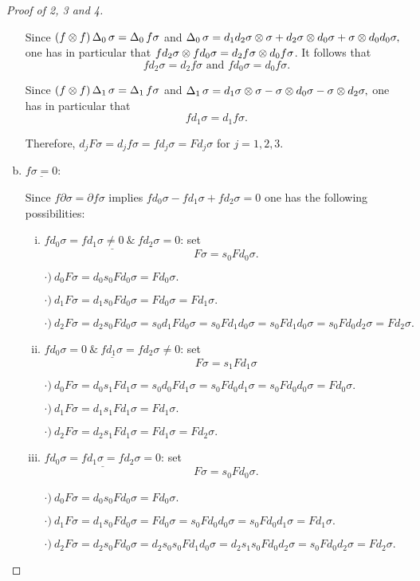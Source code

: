 \documentclass[main.tex]{subfiles}
\begin{document}
\begin{proof}[Proof of 2, 3 and 4]
\begin{enumerate}[a)]
    Since $(f\otimes f)\operatorname{\Delta}_0\sigma=\operatorname{\Delta}_0f\sigma$ and
    $\operatorname{\Delta}_0\sigma=d_1d_2\sigma\otimes\sigma + d_2\sigma\otimes d_0\sigma + \sigma\otimes d_0d_0\sigma,$
    one has in particular that $fd_2\sigma\otimes fd_0\sigma=d_2f\sigma\otimes d_0f\sigma$. It follows that $$fd_2\sigma=d_2f\sigma \text{ and } fd_0\sigma=d_0f\sigma.$$

    Since $(f\otimes f)\operatorname{\Delta}_1\sigma=\operatorname{\Delta}_1f\sigma$ and
    $\operatorname{\Delta}_1\sigma=d_1\sigma\otimes\sigma - \sigma\otimes d_0\sigma - \sigma\otimes d_2\sigma,$
    one has in particular that $$fd_1\sigma=d_1f\sigma.$$

    Therefore, $d_jF\sigma=d_jf\sigma=fd_j\sigma=Fd_j\sigma$ for $j=1,2,3$. \par

    \item $\underline{f\sigma=0}$: \vspace*{5pt}\par

    Since $f\partial\sigma=\partial f\sigma$ implies $fd_0\sigma-fd_1\sigma+fd_2\sigma=0$ one has the following possibilities:

        \begin{enumerate}[i)]

        \item $\underline{fd_0\sigma=fd_1\sigma\neq0\ \&\ fd_2\sigma=0}$: set $$F\sigma=s_0Fd_0\sigma.$$

        $\cdot)\ d_0F\sigma=d_0s_0Fd_0\sigma=Fd_0\sigma.$\par
        $\cdot)\ d_1F\sigma=d_1s_0Fd_0\sigma=Fd_0\sigma=Fd_1\sigma.$\par
        $\cdot)\ d_2F\sigma=d_2s_0Fd_0\sigma=s_0d_1Fd_0\sigma=s_0Fd_1d_0\sigma=s_0Fd_1d_0\sigma=s_0Fd_0d_2\sigma=Fd_2\sigma.$

        \item $\underline{fd_0\sigma=0\ \&\ fd_1\sigma=fd_2\sigma\neq0}$: set $$F\sigma=s_1Fd_1\sigma$$

        $\cdot)\ d_0F\sigma=d_0s_1Fd_1\sigma=s_0d_0Fd_1\sigma=s_0Fd_0d_1\sigma=s_0Fd_0d_0\sigma=Fd_0\sigma.$\par
        $\cdot)\ d_1F\sigma=d_1s_1Fd_1\sigma=Fd_1\sigma.$\par
        $\cdot)\ d_2F\sigma=d_2s_1Fd_1\sigma=Fd_1\sigma=Fd_2\sigma.$

        \item $\underline{fd_0\sigma=fd_1\sigma=fd_2\sigma=0}$: set $$F\sigma=s_0Fd_0\sigma.$$

        $\cdot)\ d_0F\sigma=d_0s_0Fd_0\sigma=Fd_0\sigma$.\par
        $\cdot)\ d_1F\sigma=d_1s_0Fd_0\sigma=Fd_0\sigma=s_0Fd_0d_0\sigma=s_0Fd_0d_1\sigma=Fd_1\sigma.$\par
        $\cdot)\ d_2F\sigma=d_2s_0Fd_0\sigma=d_2s_0s_0Fd_1d_0\sigma=d_2s_1s_0Fd_0d_2\sigma=s_0Fd_0d_2\sigma=Fd_2\sigma.$


\end{enumerate}
\end{enumerate}
\end{proof}
\end{document}
